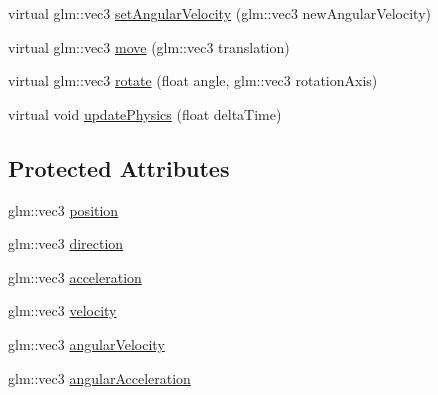 \begin{DoxyCompactItemize}
\item 
virtual glm\+::vec3 \hyperlink{class_g_g_e_1_1_entity_aa92ebf0b5b04c006abfe3f36439baf75}{set\+Angular\+Velocity} (glm\+::vec3 new\+Angular\+Velocity)
\item 
virtual glm\+::vec3 \hyperlink{class_g_g_e_1_1_entity_a7525dd307ec84c0eb4052886142a57fb}{move} (glm\+::vec3 translation)
\item 
virtual glm\+::vec3 \hyperlink{class_g_g_e_1_1_entity_a98fd8225a41364d0a2d89eb0590430de}{rotate} (float angle, glm\+::vec3 rotation\+Axis)
\item 
virtual void \hyperlink{class_g_g_e_1_1_entity_a22c9a6258e81ee6bd250732121e8c26f}{update\+Physics} (float delta\+Time)
\end{DoxyCompactItemize}
\subsection*{Protected Attributes}
\begin{DoxyCompactItemize}
\item 
glm\+::vec3 \hyperlink{class_g_g_e_1_1_entity_a38a9fa01bfaf37ca415181ba6a179d3f}{position}
\item 
glm\+::vec3 \hyperlink{class_g_g_e_1_1_entity_a80c69365314541244f26e4a15b4223d8}{direction}
\item 
glm\+::vec3 \hyperlink{class_g_g_e_1_1_entity_ad27c3100a20150cc1539f1bf199f1ba3}{acceleration}
\item 
glm\+::vec3 \hyperlink{class_g_g_e_1_1_entity_a4fd6a0bab72b12da601c34e7f3fe4620}{velocity}
\item 
glm\+::vec3 \hyperlink{class_g_g_e_1_1_entity_a750368da3d794d8d1ea3a51357dcacdd}{angular\+Velocity}
\item 
glm\+::vec3 \hyperlink{class_g_g_e_1_1_entity_ae7c0ce4f2567c988b77bb3925830f946}{angular\+Acceleration}
\end{DoxyCompactItemize}



